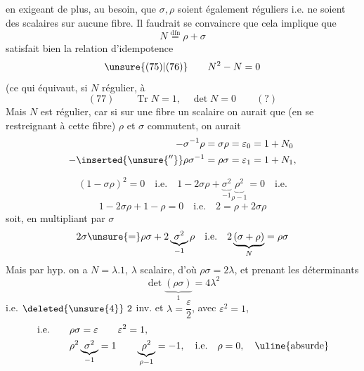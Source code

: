 en exigeant de plus, au besoin, que $\sigma,\rho$ soient également réguliers i.e. ne soient des scalaires sur aucune fibre. Il faudrait se convaincre que cela implique que
\[
N\mathrel{\overset{\mathrm{dfn}}{=}}\rho+\sigma
\]
satisfait bien la relation d'idempotence
\[
\unsure{(75)|(76)}\qquad N^2-N=0
\]
(ce qui équivaut, si $N$ régulier, à
\[
(77)\qquad \operatorname{Tr}N=1,\quad\det N=0\qquad (?)
\]
Mais $N$ est régulier, car si sur une fibre  un scalaire on aurait que (en se restreignant à cette fibre) $\rho$ et $\sigma$ commutent, on aurait
\[
\begin{aligned}
-\sigma^{-1}\rho&=\sigma\rho=\varepsilon_0=1+N_0\\
-\inserted{\unsure{''}}\rho\sigma^{-1}&=\rho\sigma=\varepsilon_1=1+N_1,
\end{aligned}
\]

\[
(1-\sigma\rho)^2=0\quad\text{i.e.}\quad
1-2\sigma\rho+\underbrace{\sigma^2}_{-1}\underbrace{\rho^2}_{\rho-1}=0\quad\text{i.e.}
\]
\[
1-2\sigma\rho+1-\rho=0\quad\text{i.e.}\quad 2=\rho+2\sigma\rho
\]
soit, en multipliant par $\sigma$
\[
2\sigma\unsure{=}\rho\sigma+2\underbrace{\sigma^2}_{-1}\rho
\quad\text{i.e.}\quad 2\underbrace{(\sigma+\rho)}_{N}=\rho\sigma
\]
Mais par hyp. on a $N=\lambda.1$, $\lambda$ scalaire, d'où $\rho\sigma=2\lambda$, et prenant les déterminants
\[
\det\underbrace{(\rho\sigma)}_{1}=4\lambda^2
\]
i.e. $\deleted{\unsure{4}}\ 2$ inv. et $\lambda=\dfrac{\varepsilon}{2}$, avec $\varepsilon^2=1$,
\[
\begin{aligned}
\text{i.e.}\qquad&\rho\sigma=\varepsilon\qquad\varepsilon^2=1,\\
&\rho^2\underbrace{\sigma^2}_{-1}=1\qquad\underbrace{\rho^2}_{\rho-1}=-1,\quad\text{i.e.}\quad\rho=0,\quad\text{\uline{absurde}}
\end{aligned}
\]

